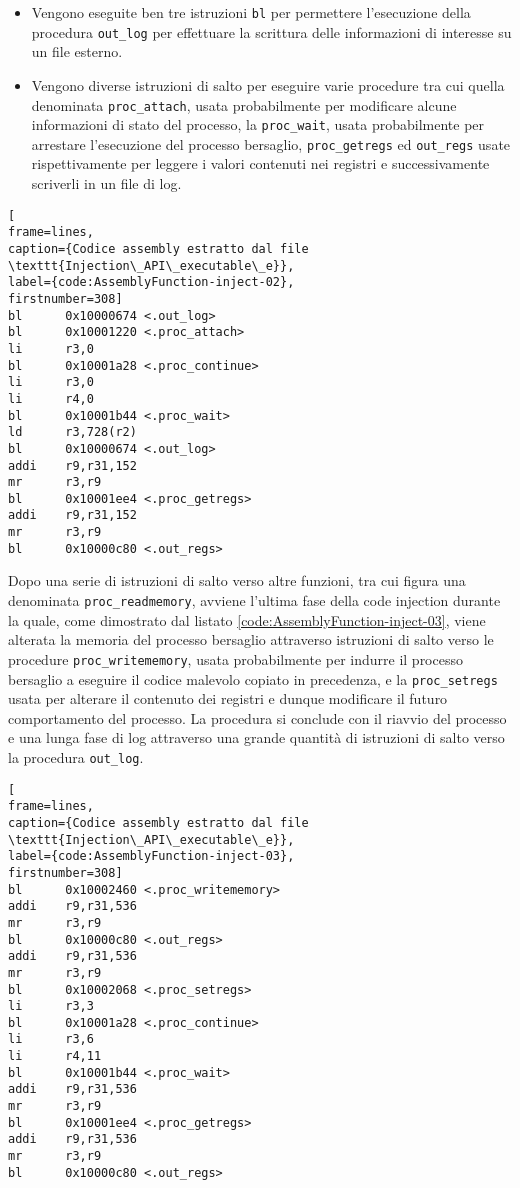 \documentclass[10pt,a4paper, titlepage]{report}
\begin{document}
\begin{itemize}
\item Vengono eseguite ben tre istruzioni \texttt{bl} per permettere l'esecuzione della procedura \texttt{out\_log} per effettuare la scrittura delle informazioni di interesse su un file esterno.
\item Vengono diverse istruzioni di salto per eseguire varie procedure tra cui quella denominata \texttt{proc\_attach}, usata probabilmente per modificare alcune informazioni di stato del processo, la \texttt{proc\_wait}, usata probabilmente per arrestare l'esecuzione del processo bersaglio, \texttt{proc\_getregs} ed \texttt{out\_regs} usate rispettivamente per leggere i valori contenuti nei registri e successivamente scriverli in un file di log.

\end{itemize}

\begin{lstlisting}[
frame=lines, 
caption={Codice assembly estratto dal file \texttt{Injection\_API\_executable\_e}}, 
label={code:AssemblyFunction-inject-02},
firstnumber=308]
bl      0x10000674 <.out_log>
bl      0x10001220 <.proc_attach>
li      r3,0
bl      0x10001a28 <.proc_continue>
li      r3,0
li      r4,0
bl      0x10001b44 <.proc_wait>
ld      r3,728(r2)
bl      0x10000674 <.out_log>
addi    r9,r31,152
mr      r3,r9
bl      0x10001ee4 <.proc_getregs>
addi    r9,r31,152
mr      r3,r9
bl      0x10000c80 <.out_regs>
\end{lstlisting}

Dopo una serie di istruzioni di salto verso altre funzioni, tra cui figura una denominata \texttt{proc\_readmemory}, avviene l'ultima fase della code injection durante la quale, come dimostrato dal listato \ref{code:AssemblyFunction-inject-03}, viene alterata la memoria del processo bersaglio attraverso istruzioni di salto verso le procedure \texttt{proc\_writememory}, usata probabilmente per indurre il processo bersaglio a eseguire il codice malevolo copiato in precedenza, e la \texttt{proc\_setregs} usata per alterare il contenuto dei registri e dunque modificare il futuro comportamento del processo. La procedura si conclude con il riavvio del processo e una lunga fase di log attraverso una grande quantità di istruzioni di salto verso la procedura \texttt{out\_log}.

\begin{lstlisting}[
frame=lines, 
caption={Codice assembly estratto dal file \texttt{Injection\_API\_executable\_e}}, 
label={code:AssemblyFunction-inject-03},
firstnumber=308]
bl      0x10002460 <.proc_writememory>
addi    r9,r31,536
mr      r3,r9
bl      0x10000c80 <.out_regs>
addi    r9,r31,536
mr      r3,r9
bl      0x10002068 <.proc_setregs>
li      r3,3
bl      0x10001a28 <.proc_continue>
li      r3,6
li      r4,11
bl      0x10001b44 <.proc_wait>
addi    r9,r31,536
mr      r3,r9
bl      0x10001ee4 <.proc_getregs>
addi    r9,r31,536
mr      r3,r9
bl      0x10000c80 <.out_regs>
\end{lstlisting}
\end{document}
